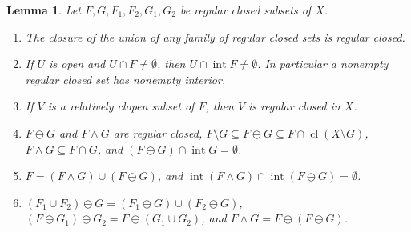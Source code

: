 \documentclass[11pt,reqno]{amsart}
\theoremstyle{plain}
\newtheorem{lemma}[theorem]{Lemma}
\theoremstyle{definition}
\theoremstyle{remark}
\newcommand{\cl}{\operatorname{cl}}
\newcommand{\intr}{\operatorname{int}}
\newcommand{\rd}{\ominus}
\begin{document}
\begin{lemma}\label{L:rc}
Let $F,G,F_1,F_2,G_1,G_2$ be regular closed subsets of $X$.
\begin{enumerate}[label=\textup{(\alph*)}]
\item\label{rc:union} The closure of the union of any family of regular closed sets is regular closed.
\item\label{rc:open} If $U$ is open and $U\cap F\neq\emptyset$, then $U\cap\intr F\neq\emptyset$. In particular a nonempty regular closed set has nonempty interior.
\item\label{rc:clopen} If $V$ is a relatively clopen subset of $F$, then $V$ is regular closed in $X$.
\item\label{rc:basic} $F\rd G$ and $F\wedge G$ are regular closed, $F\setminus G\subseteq F\rd G\subseteq F\cap\cl(X\setminus G)$, $F\wedge G\subseteq F\cap G$, and $(F\rd G)\cap\intr G=\emptyset$.
\item\label{rc:split} $F=(F\wedge G)\cup(F\rd G)$, and $\intr(F\wedge G)\cap\intr(F\rd G)=\emptyset$.
\item\label{rc:ident} $(F_1\cup F_2)\rd G=(F_1\rd G)\cup(F_2\rd G)$, $(F\rd G_1)\rd G_2=F\rd(G_1\cup G_2)$, and $F\wedge G=F\rd(F\rd G)$.
\end{enumerate}
\end{lemma}
\end{document}
